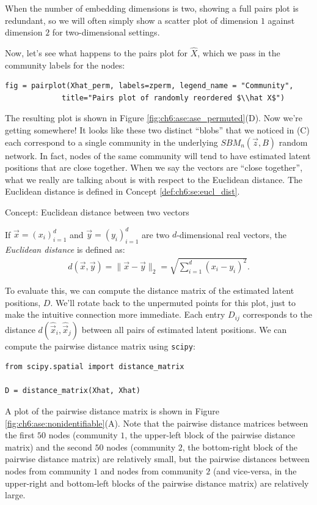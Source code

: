 When the number of embedding dimensions is two, showing a full pairs plot is redundant, so we will often simply show a scatter plot of dimension $1$ against dimension $2$ for two-dimensional settings.

Now, let's see what happens to the pairs plot for $\hat X$, which we pass in the community labels for the nodes:

\begin{lstlisting}[style=python]
fig = pairplot(Xhat_perm, labels=zperm, legend_name = "Community",
             title="Pairs plot of randomly reordered $\\hat X$")
\end{lstlisting}

The resulting plot is shown in Figure \ref{fig:ch6:ase:ase_permuted}(D). Now we're getting somewhere! It looks like these two distinct ``blobs'' that we noticed in (C) each correspond to a single community in the underlying $SBM_n(\vec z, B)$ random network. In fact, nodes of the same community will tend to have estimated latent positions that are close together. When we say the vectors are ``close together'', what we really are talking about is with respect to the Euclidean distance. The Euclidean distance is defined in Concept \ref{def:ch6:se:eucl_dist}.

\begin{floatingbox}[h]\caption{Concept: Euclidean distance between two vectors}
\label{def:ch6:se:eucl_dist}

If $\vec x = (x_i)_{i = 1}^d$ and $\vec y = (y_i)_{i = 1}^d$ are two $d$-dimensional real vectors, the \textit{Euclidean distance} is defined as:
\begin{align*}
    d(\vec x, \vec y) = \|\vec x - \vec y\|_2 = \sqrt{\sum_{i = 1}^d (x_i - y_i)^2}.
\end{align*}
\end{floatingbox}
To evaluate this, we can compute the distance matrix of the estimated latent positions, $D$. We'll rotate back to the unpermuted points for this plot, just to make the intuitive connection more immediate. Each entry $D_{ij}$ corresponds to the distance $d(\hat{\vec x}_i, \hat{\vec x}_j)$ between all pairs of estimated latent positions. We can compute the pairwise distance matrix using \texttt{scipy}:

\begin{lstlisting}[style=python]
from scipy.spatial import distance_matrix

D = distance_matrix(Xhat, Xhat)
\end{lstlisting}
A plot of the pairwise distance matrix is shown in Figure \ref{fig:ch6:ase:nonidentifiable}(A). Note that the pairwise distance matrices between the first $50$ nodes (community $1$, the upper-left block of the pairwise distance matrix) and the second $50$ nodes (community $2$, the bottom-right block of the pairwise distance matrix) are relatively small, but the pairwise distances between nodes from community $1$ and nodes from community $2$ (and vice-versa, in the upper-right and bottom-left blocks of the pairwise distance matrix) are relatively large.

